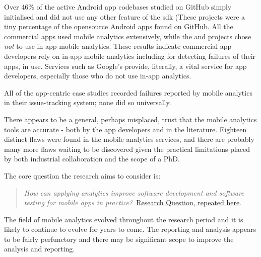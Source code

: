 Over 46\% of the active Android app codebases studied on GitHub simply initialised  and did not use any other feature of the \Gls{sdk} (These projects were a tiny percentage of the opensource Android apps found on GitHub. All the commercial apps used mobile analytics extensively, while the  and  projects chose \emph{not} to use in-app mobile analytics. These results indicate commercial app developers rely on in-app mobile analytics including for detecting failures of their apps, in use. Services such as Google's  provide, literally, a vital service for app developers, especially those who do not use in-app analytics.

All of the app-centric case studies recorded failures reported by mobile analytics in their issue-tracking system; none did so universally.



There appears to be a general, perhaps misplaced, trust that the mobile analytics tools are accurate - both by the app developers and in the literature. Eighteen distinct flaws were found in the mobile analytics services, and there are probably many more flaws waiting to be discovered given the practical limitations placed by both industrial collaboration and the scope of a PhD. 





The core question the research aims to consider is:
\begin{quote}
  \emph{How can applying analytics improve software development and software testing for mobile apps in practice?}~\href{overall-research-question}{Research Question, repeated here}.
\end{quote}






The field of mobile analytics evolved throughout the research period and it is likely to continue to evolve for years to come. The reporting and analysis appears to be fairly perfunctory and there may be significant scope to improve the analysis and reporting.




